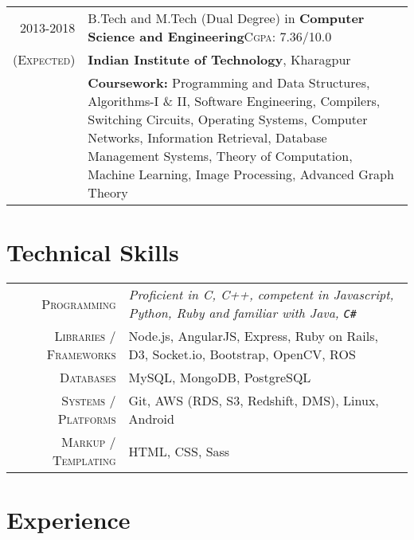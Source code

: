 \documentclass[a4paper,10pt]{extarticle} %
\begin{document}
\begin{tabular}{r|p{17.5cm}}	
2013-2018 & B.Tech and M.Tech (Dual Degree) in \textbf{Computer Science and Engineering}\hfill\textsc{Cgpa}: 7.36/10.0\\
\textsc{(Expected)}&\textbf{Indian Institute of Technology}, Kharagpur\\
&\textbf{Coursework: }{Programming and Data Structures, Algorithms-I \& II, Software Engineering, Compilers, Switching Circuits, Operating Systems, Computer Networks, Information Retrieval, Database Management Systems, Theory of Computation, Machine Learning, Image Processing, Advanced Graph Theory}
\end{tabular}


\section{Technical Skills}

\begin{tabular}{r|p{17.5cm}}
\textsc{Programming} & \itshape{Proficient in} C, C++, \itshape{competent in} Javascript, Python, Ruby and \itshape{familiar with} Java, \verb!C#! \\
\textsc{Libraries / Frameworks} & Node.js, AngularJS, Express, Ruby on Rails, D3, Socket.io, Bootstrap, OpenCV, ROS\\
\textsc{Databases} & MySQL, MongoDB, PostgreSQL\\
\textsc{Systems / Platforms} & Git, AWS (RDS, S3, Redshift, DMS), Linux, Android\\
\textsc{Markup / Templating} & HTML, CSS, Sass
\end{tabular}

\section{Experience}
\end{document}
